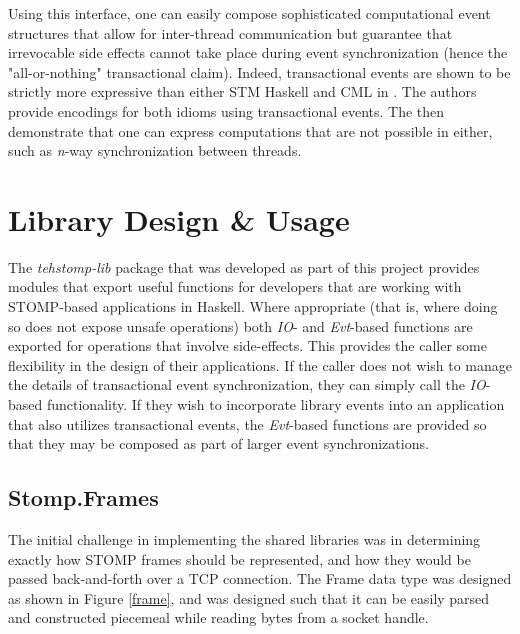 \documentclass[conference, letterpaper]{IEEEtran}
\begin{document}
Using this interface, one can easily compose sophisticated computational event structures that allow for inter-thread communication but guarantee that irrevocable side effects cannot take place during event synchronization (hence the "all-or-nothing" transactional claim). Indeed, transactional events are shown to be strictly more expressive than either STM Haskell and CML in \cite{te:original}. The authors provide encodings for both idioms using transactional events. The then demonstrate that one can express computations that are not possible in either, such as \textit{n}-way synchronization between threads.

\section{Library Design \& Usage}

The \textit{tehstomp-lib} package that was developed as part of this project provides modules that export useful functions for developers that are working with STOMP-based applications in Haskell. Where appropriate (that is, where doing so does not expose unsafe operations) both \textit{IO}- and \textit{Evt}-based functions are exported for operations that involve side-effects. This provides the caller some flexibility in the design of their applications. If the caller does not wish to manage the details of transactional event synchronization, they can simply call the \textit{IO}-based functionality. If they wish to incorporate library events into an application that also utilizes transactional events, the \textit{Evt}-based functions are provided so that they may be composed as part of larger event synchronizations.

\subsection{Stomp.Frames}

The initial challenge in implementing the shared libraries was in determining exactly how STOMP frames should be represented, and how they would be passed back-and-forth over a TCP connection. The Frame data type was designed as shown in Figure \ref{frame}, and was designed such that it can be easily parsed and constructed piecemeal while reading bytes from a socket handle.
\end{document}
